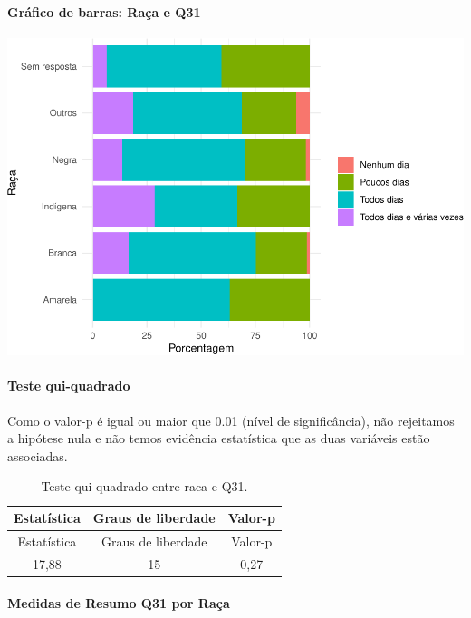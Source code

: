 \documentclass[]{article}
\let\oldparagraph\paragraph
\renewcommand{\paragraph}[1]{\oldparagraph{#1}\mbox{}}
\begin{document}
\hypertarget{gruxe1fico-de-barras-rauxe7a-e-q31}{%
\paragraph{Gráfico de barras: Raça e Q31}\label{gruxe1fico-de-barras-rauxe7a-e-q31}}

\begin{center}\includegraphics[width=0.75\linewidth]{relatorio_covid19_files/figure-latex/unnamed-chunk-1046-1} \end{center}

\hypertarget{teste-qui-quadrado-90}{%
\paragraph{Teste qui-quadrado}\label{teste-qui-quadrado-90}}

Como o valor-p é igual ou maior que 0.01 (nível de significância), não rejeitamos a hipótese nula e não temos evidência estatística que as duas variáveis estão associadas.

\begin{longtable}[]{@{}ccc@{}}
\caption{\label{tab:unnamed-chunk-1048}Teste qui-quadrado entre raca e Q31.}\tabularnewline
\toprule
Estatística & Graus de liberdade & Valor-p\tabularnewline
\midrule
\endfirsthead
\toprule
Estatística & Graus de liberdade & Valor-p\tabularnewline
\midrule
\endhead
17,88 & 15 & 0,27\tabularnewline
\bottomrule
\end{longtable}

\cleardoublepage

\hypertarget{medidas-de-resumo-q31-por-rauxe7a}{%
\paragraph{Medidas de Resumo Q31 por Raça}\label{medidas-de-resumo-q31-por-rauxe7a}}
\end{document}
